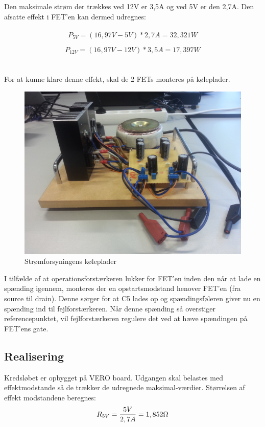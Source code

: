 Den maksimale strøm der trækkes ved 12V er 3,5A og ved 5V er den 2,7A. Den afsatte effekt i FET'en kan dermed udregnes:
\\\\
\begin{equation}
	P_{5V} = (16,97V - 5V) * 2,7A = 32,321W
\end{equation}

\begin{equation}
	P_{12V} = (16,97V - 12V) * 3,5A = 17,397W
\end{equation}
\\\\
For at kunne klare denne effekt, skal de 2 FETs monteres på køleplader.

\begin{figure}[H]
	\centering
	\includegraphics[scale=0.1]{../Hardware/PSU/Koeleplade}
	\caption{Strømforsyningens køleplader}
	\label{photo:Koeleplade}
\end{figure}

I tilfælde af at operationsforstærkeren lukker for FET'en inden den når at lade en spænding igennem, monteres der en opstartsmodstand henover FET'en (fra source til drain).
Denne sørger for at C5 lades op og spændingsføleren giver nu en spænding ind til fejlforstærkeren. Når denne spænding så overstiger referencepunktet,
vil fejlforstærkeren regulere det ved at hæve spændingen på FET'ens gate.


\subsection{Realisering}
Kredsløbet er opbygget på VERO board. Udgangen skal belastes med effektmodstande så de trækker de udregnede maksimal-værdier.
Størrelsen af effekt modstandene beregnes:
\begin{equation}
	R_{5V} = \frac{5V}{2,7A} = 1,852\ohm
\end{equation}

